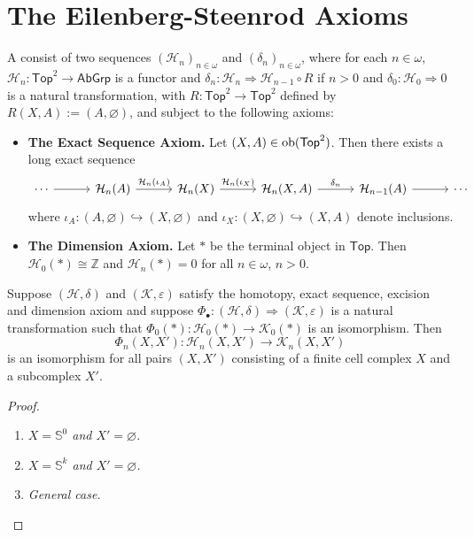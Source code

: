 \section*{The Eilenberg-Steenrod Axioms}

\begin{definition}
	A  consist of two sequences $(\mathcal{H}_n)_{n \in \omega}$ and $(\delta_n)_{n \in \omega}$, where for each $n \in \omega$, $\mathcal{H}_n : \mathsf{Top}^2 \to \mathsf{AbGrp}$ is a functor and $\delta_n : \mathcal{H}_n \Rightarrow \mathcal{H}_{n - 1} \circ R$ if $n > 0$ and $\delta_0 : \mathcal{H}_0 \Rightarrow 0$ is a natural transformation, with $R : \mathsf{Top}^2 \to \mathsf{Top}^2$ defined by $R(X,A) := (A,\varnothing)$, and subject to the following axioms:
	\begin{itemize}[wide = 0pt]
		\item \textbf{The Exact Sequence Axiom.} Let $(X,A) \in \operatorname{ob}(\mathsf{Top}^2)$. Then there exists a long exact sequence
			\begin{equation*}
				\begin{tikzcd}[column sep=7ex]
					\cdots \arrow[r] & \mathcal{H}_n(A) \arrow[r,"\mathcal{H}_n(\iota_A)"] & \mathcal{H}_n(X) \arrow[r,"\mathcal{H}_n(\iota_X)"] & \mathcal{H}_n(X,A) \arrow[r,"\delta_n"] & \mathcal{H}_{n - 1}(A) \arrow[r] & \cdots
				\end{tikzcd}
			\end{equation*}
			\noindent where $\iota_A : (A,\varnothing) \hookrightarrow (X,\varnothing)$ and $\iota_X : (X,\varnothing) \hookrightarrow (X,A)$ denote inclusions.
		\item \textbf{The Dimension Axiom.} Let $\ast$ be the terminal object in $\mathsf{Top}$. Then $\mathcal{H}_0(\ast) \cong \mathbb{Z}$ and $\mathcal{H}_n(\ast) = 0$ for all $n \in \omega$, $n > 0$. 
	\end{itemize}
\end{definition}

\begin{theorem}
	Suppose $(\mathcal{H},\delta)$ and $(\mathcal{K},\varepsilon)$ satisfy the homotopy, exact sequence, excision and dimension axiom and suppose $\Phi_\bullet  : (\mathcal{H},\delta) \Rightarrow (\mathcal{K},\varepsilon)$ is a natural transformation such that $\Phi_0(\ast) : \mathcal{H}_0(\ast) \to \mathcal{K}_0(\ast)$ is an isomorphism. Then
	\begin{equation*}
		\Phi_n(X,X') : \mathcal{H}_n(X,X') \to \mathcal{K}_n(X,X')
	\end{equation*}
	\noindent is an isomorphism for all pairs $(X,X')$ consisting of a finite cell complex $X$ and a subcomplex $X'$.
\end{theorem}

\begin{proof}
	\begin{enumerate}[label = \textit{Step \arabic*:},wide = 0pt]
		\item \textit{$X = \mathbb{S}^0$ and $X' = \varnothing$.}
		\item \textit{$X = \mathbb{S}^k$ and $X' = \varnothing$.}
		\item \textit{General case.}
	\end{enumerate}
\end{proof}
